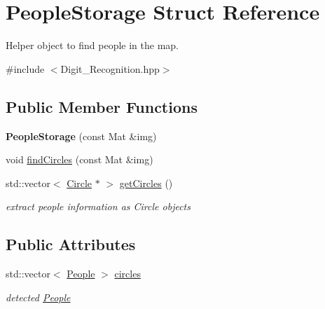 \hypertarget{struct_people_storage}{}\section{People\+Storage Struct Reference}
\label{struct_people_storage}


Helper object to find people in the map.  




{\ttfamily \#include $<$Digit\+\_\+\+Recognition.\+hpp$>$}

\subsection*{Public Member Functions}
\begin{DoxyCompactItemize}
\item 
\mbox{\label{struct_people_storage_a6aa999011975c71c5dac2c011d0fba4c}} 
{\bfseries People\+Storage} (const Mat \&img)
\item 
void \mbox{\hyperlink{struct_people_storage_a97206f5a49064a68924059861deab436}{find\+Circles}} (const Mat \&img)
\item 
\mbox{\label{struct_people_storage_a461a143e3b928603f383eccf65a79bdf}} 
std\+::vector$<$ \mbox{\hyperlink{class_geometry2_d_1_1_circle}{Circle}} $\ast$ $>$ \mbox{\hyperlink{struct_people_storage_a461a143e3b928603f383eccf65a79bdf}{get\+Circles}} ()
\begin{DoxyCompactList}\small\item\em extract people information as Circle objects \end{DoxyCompactList}\end{DoxyCompactItemize}
\subsection*{Public Attributes}
\begin{DoxyCompactItemize}
\item 
\mbox{\label{struct_people_storage_a00dd487841221f7b5094934c1409957a}} 
std\+::vector$<$ \mbox{\hyperlink{class_people}{People}} $>$ \mbox{\hyperlink{struct_people_storage_a00dd487841221f7b5094934c1409957a}{circles}}
\begin{DoxyCompactList}\small\item\em detected \mbox{\hyperlink{class_people}{People}} \end{DoxyCompactList}\end{DoxyCompactItemize}


